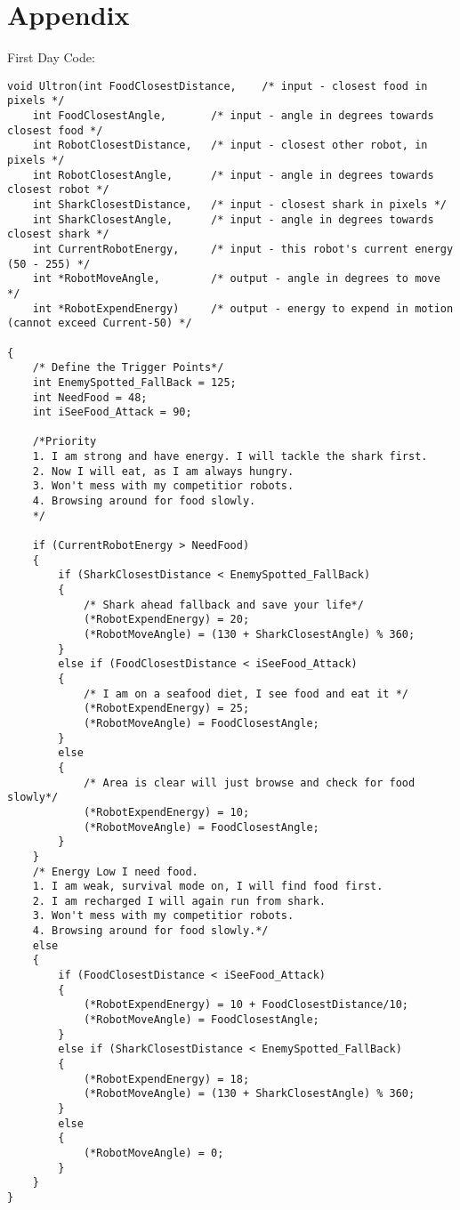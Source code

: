 \documentclass[12pt]{article}
\begin{document}
\section{Appendix}
First Day Code:
\begin{verbatim}
void Ultron(int FoodClosestDistance,	/* input - closest food in pixels */
	int FoodClosestAngle,		/* input - angle in degrees towards closest food */
	int RobotClosestDistance,	/* input - closest other robot, in pixels */
	int RobotClosestAngle,		/* input - angle in degrees towards closest robot */
	int SharkClosestDistance,	/* input - closest shark in pixels */
	int SharkClosestAngle,		/* input - angle in degrees towards closest shark */
	int CurrentRobotEnergy,		/* input - this robot's current energy (50 - 255) */
	int *RobotMoveAngle,		/* output - angle in degrees to move */
	int *RobotExpendEnergy)		/* output - energy to expend in motion (cannot exceed Current-50) */

{
	/* Define the Trigger Points*/
	int EnemySpotted_FallBack = 125;
	int NeedFood = 48; 
	int iSeeFood_Attack = 90;

	/*Priority
	1. I am strong and have energy. I will tackle the shark first.
	2. Now I will eat, as I am always hungry.
	3. Won't mess with my competitior robots.
	4. Browsing around for food slowly.
	*/

	if (CurrentRobotEnergy > NeedFood)
	{
		if (SharkClosestDistance < EnemySpotted_FallBack)
		{
			/* Shark ahead fallback and save your life*/
			(*RobotExpendEnergy) = 20;
			(*RobotMoveAngle) = (130 + SharkClosestAngle) % 360;
		}
		else if (FoodClosestDistance < iSeeFood_Attack)
		{
			/* I am on a seafood diet, I see food and eat it */
			(*RobotExpendEnergy) = 25;
			(*RobotMoveAngle) = FoodClosestAngle;
		}
		else
		{
			/* Area is clear will just browse and check for food slowly*/
			(*RobotExpendEnergy) = 10;
			(*RobotMoveAngle) = FoodClosestAngle; 
		}
	}
	/* Energy Low I need food.
	1. I am weak, survival mode on, I will find food first.
	2. I am recharged I will again run from shark.
	3. Won't mess with my competitior robots.
	4. Browsing around for food slowly.*/
	else
	{
		if (FoodClosestDistance < iSeeFood_Attack)
		{
			(*RobotExpendEnergy) = 10 + FoodClosestDistance/10;
			(*RobotMoveAngle) = FoodClosestAngle;
		}
		else if (SharkClosestDistance < EnemySpotted_FallBack)
		{
			(*RobotExpendEnergy) = 18;
			(*RobotMoveAngle) = (130 + SharkClosestAngle) % 360;
		}
		else
		{
			(*RobotMoveAngle) = 0;
		}
	}
}
\end{verbatim}\\
\end{document}
